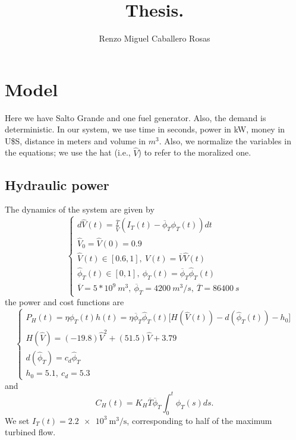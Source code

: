 \documentclass[12pt]{article}
\theoremstyle{definition}
\theoremstyle{remark}
\begin{document}
\title{Thesis.}
\author{Renzo Miguel Caballero Rosas} 
\maketitle

\pagebreak
\tableofcontents
\pagebreak

\section{Model}

Here we have Salto Grande and one fuel generator. Also, the demand is deterministic. In our system, we use time in seconds, power in kW, money in U\$S, distance in meters and volume in $m^3$. Also, we normalize the variables in the equations; we use the hat (i.e., $\hat{V}$) to refer to the moralized one.

\subsection{Hydraulic power}

The dynamics of the system are given by
\begin{equation*}
\begin{cases}
d\hat{V}(t)=\frac{\overline{T}}{\overline{V}}(I_T(t)-\overline{\phi}_T\hat{\phi}_T(t))dt\\
\hat{V}_0=\hat{V}(0)=0.9\\
\hat{V}(t)\in[0.6,1],\ V(t)=\overline{V}\hat{V}(t)\\
\hat{\phi}_T(t)\in[0,1],\ \phi_T(t)=\overline{\phi}_T\hat{\phi}_T(t)\\
\overline{V}=5*10^9\ m^3,\ \overline{\phi}_T=4200\ m^3/s,\ \overline{T}=86400\ s
\end{cases}
\end{equation*}
the power and cost functions are
\begin{equation*}
\begin{cases}
P_H(t)=\eta\phi_T(t)h(t)=\eta\overline{\phi}_T\hat{\phi}_T(t)\Big[H(\hat{V}(t))-d(\hat{\phi}_T(t))-h_0\Big]\\
H(\hat{V})=(-19.8)\hat{V}^2+(51.5)\hat{V}+3.79\\
d(\hat{\phi}_T)=c_d\hat{\phi}_T\\
h_0=5.1,\ c_d=5.3
\end{cases}
\end{equation*}
and
\begin{equation*}
C_H(t)=K_H\overline{T}\overline{\phi}_T\int_0^t\hat{\phi}_T(s)ds.
\end{equation*}
We set $I_T(t)=\SI{2.2e3}{\m^3/\s}$, corresponding to half of the maximum turbined flow.
\end{document}
